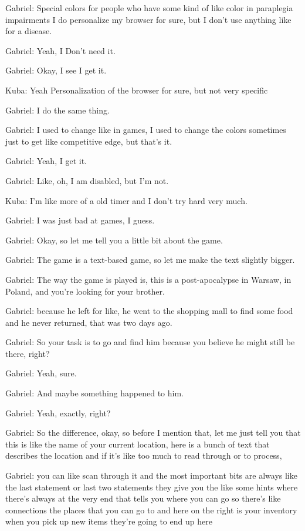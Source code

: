 Gabriel: Special colors for people who have some kind of like color in paraplegia impairments I do personalize my browser for sure, but I don't use anything like for a disease.

Gabriel: Yeah, I Don't need it.

Gabriel: Okay, I see I get it.

Kuba: Yeah Personalization of the browser for sure, but not very specific

Gabriel: I do the same thing.

Gabriel: I used to change like in games, I used to change the colors sometimes just to get like competitive edge, but that's it.

Gabriel: Yeah, I get it.

Gabriel: Like, oh, I am disabled, but I'm not.

Kuba: I'm like more of a old timer and I don't try hard very much.

Gabriel: I was just bad at games, I guess.

Gabriel: Okay, so let me tell you a little bit about the game.

Gabriel: The game is a text-based game, so let me make the text slightly bigger.

Gabriel: The way the game is played is, this is a post-apocalypse in Warsaw, in Poland, and you're looking for your brother.

Gabriel: because he left for like, he went to the shopping mall to find some food and he never returned, that was two days ago.

Gabriel: So your task is to go and find him because you believe he might still be there, right?

Gabriel: Yeah, sure.

Gabriel: And maybe something happened to him.

Gabriel: Yeah, exactly, right?

Gabriel: So the difference, okay, so before I mention that, let me just tell you that this is like the name of your current location, here is a bunch of text that describes the location and if it's like too much to read through or to process,

Gabriel: you can like scan through it and the most important bits are always like the last statement or last two statements they give you the like some hints where there's always at the very end that tells you where you can go so there's like connections the places that you can go to and here on the right is your inventory when you pick up new items they're going to end up here

